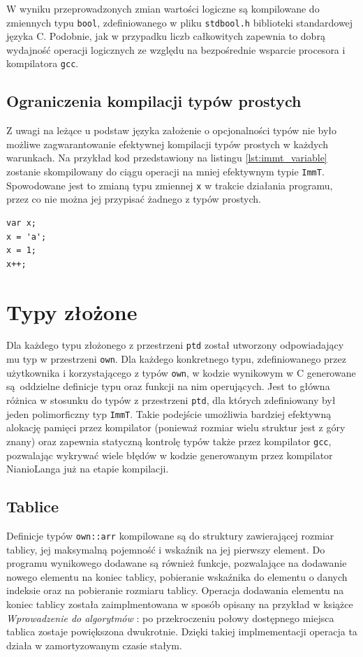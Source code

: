 \documentclass[licencjacka]{pracamgr}
\begin{document}
W wyniku przeprowadzonych zmian wartości logiczne są kompilowane do zmiennych typu \texttt{bool},
zdefiniowanego w pliku \texttt{stdbool.h} biblioteki standardowej języka C.
Podobnie, jak w przypadku liczb całkowitych zapewnia to dobrą wydajność operacji logicznych
ze względu na bezpośrednie wsparcie procesora i kompilatora \texttt{gcc}.

\subsection{Ograniczenia kompilacji typów prostych}
Z uwagi na leżące u podstaw języka założenie o opcjonalności typów nie było możliwe
zagwarantowanie efektywnej kompilacji typów prostych w każdych warunkach.
Na przykład kod przedstawiony na listingu \ref{lst:immt_variable} zostanie skompilowany do ciągu operacji na mniej efektywnym typie
\texttt{ImmT}. Spowodowane jest to zmianą typu zmiennej \texttt{x} w trakcie działania programu,
przez co nie można jej przypisać żadnego z typów prostych.
\begin{lstlisting}[caption={Zmienna kompilowana do typu \texttt{ImmT}},label={lst:immt_variable}]
var x;
x = 'a';
x = 1;
x++;
\end{lstlisting}

\section{Typy złożone}
Dla każdego typu złożonego z przestrzeni \texttt{ptd} został utworzony odpowiadający mu typ
w przestrzeni \texttt{own}. Dla każdego konkretnego typu, zdefiniowanego przez użytkownika
i korzystającego z typów \texttt{own}, w kodzie wynikowym w C generowane są oddzielne definicje
typu oraz funkcji na nim operujących. Jest to główna różnica w stosunku do typów z przestrzeni
\texttt{ptd}, dla których zdefiniowany był jeden polimorficzny typ \texttt{ImmT}.
Takie podejście umożliwia bardziej efektywną alokację pamięci przez kompilator (ponieważ rozmiar
wielu struktur jest z góry znany) oraz zapewnia statyczną kontrolę typów także przez kompilator
\texttt{gcc}, pozwalając wykrywać wiele błędów w kodzie generowanym przez kompilator
NianioLanga już na etapie kompilacji.
\subsection{Tablice}
Definicje typów \texttt{own::arr} kompilowane są do struktury zawierającej rozmiar tablicy, jej
maksymalną pojemność i wskaźnik na jej pierwszy element. Do programu wynikowego
dodawane są również funkcje,
pozwalające na dodawanie nowego elementu na koniec tablicy, pobieranie wskaźnika do elementu
o danych indeksie oraz na pobieranie rozmiaru tablicy. Operacja dodawania elementu na koniec tablicy
została zaimplmentowana w sposób opisany na przykład w książce
\textit{Wprowadzenie do algorytmów} \cite{cormen}: po przekroczeniu połowy dostępnego miejsca
tablica zostaje powiększona dwukrotnie. Dzięki takiej implmementacji operacja
ta działa w zamortyzowanym czasie stałym.
\end{document}

